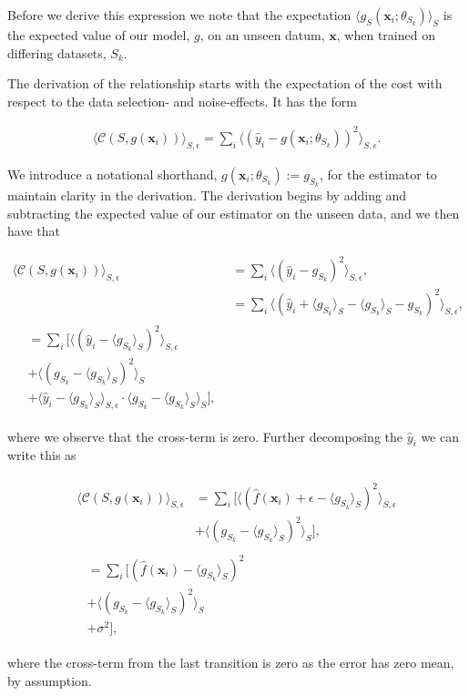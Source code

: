 \noindent Before we derive this expression we note that the expectation $\langle g_S(\mathbf{x}_i ; \theta_{S_k}) \rangle_S$ is the expected value of our model, $g$, on an unseen datum, $\mathbf{x}$, when trained on differing datasets, $S_k$. 

The derivation of the relationship starts with the expectation of the cost with respect to the data selection- and noise-effects. It has the form 

\begin{align}
\langle \mathcal{C}(S, g(\mathbf{x}_i)) \rangle_{S, \epsilon} = \sum _i \langle (\hat{y}_i - g(\mathbf{x}_i; \theta_{S_k}))^2 \rangle_{S, \epsilon}.
\end{align}

\noindent We introduce a notational shorthand, $g(\mathbf{x}_i; \theta_{S_k}) := g_{S_k}$, for the estimator to maintain clarity in the derivation. The derivation begins by adding and subtracting the expected value of our estimator on the unseen data, and we then have that

\begin{align}
\langle \mathcal{C}(S, g(\mathbf{x}_i)) \rangle_{S, \epsilon} &= \sum _i \langle (\hat{y}_i - g_{S_k})^2 \rangle_{S, \epsilon}, \\
&= \sum _i \langle (\hat{y}_i  + \langle g_{S_k}\rangle_S - \langle g_{S_k}\rangle_S  - g_{S_k})^2 \rangle_{S, \epsilon}, \\
\begin{split} 
&= \sum_i [\langle (\hat{y}_i  - \langle g_{S_k}\rangle_S )^2 \rangle_{S, \epsilon}\\
& + \langle (g_{S_k} - \langle g_{S_k}\rangle_S)^2 \rangle_{S}\\
& + \langle \hat{y}_i  - \langle g_{S_k}\rangle_S\rangle_{S, \epsilon} \cdot \langle g_{S_k} - \langle g_{S_k}\rangle_S \rangle_S ],
\end{split}
\end{align}

\noindent where we observe that the cross-term is zero. Further decomposing the $\hat{y}_i$ we can write this as 

\begin{align}
\begin{split}
\langle \mathcal{C}(S, g(\mathbf{x}_i)) \rangle_{S, \epsilon} &=
\sum_i [\langle (\hat{f}(\mathbf{x}_i) + \epsilon  - \langle g_{S_k}\rangle_S )^2 \rangle_{S, \epsilon}\\
& + \langle (g_{S_k} - \langle g_{S_k}\rangle_S)^2 \rangle_{S}],
\end{split} \\
\begin{split}
 &= \sum_i [(\hat{f}(\mathbf{x}_i) - \langle g_{S_k}\rangle_S )^2 \\
 &+ \langle (g_{S_k} - \langle g_{S_k}\rangle_S)^2 \rangle_{S}\\
 &+\sigma^2 ],
\end{split}
\end{align}

\noindent where the cross-term from the last transition is zero as the error has zero mean, by assumption. 
